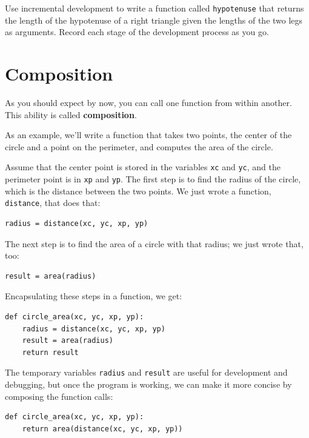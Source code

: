 \documentclass[10pt]{book}
\begin{document}
\begin{ex}


Use incremental development to write a function
called {\tt hypotenuse} that returns the length of the hypotenuse of a
right triangle given the lengths of the two legs as arguments.
Record each stage of the development process as you go.
\end{ex}


\section{Composition}


As you should expect by now, you can call one function from
within another.  This ability is called {\bf composition}.

As an example, we'll write a function that takes two points,
the center of the circle and a point on the perimeter, and computes
the area of the circle.

Assume that the center point is stored in the variables {\tt xc} and
{\tt yc}, and the perimeter point is in {\tt xp} and {\tt yp}. The
first step is to find the radius of the circle, which is the distance
between the two points.  We just wrote a function, {\tt
distance}, that does that:

\beforeverb
\begin{verbatim}
radius = distance(xc, yc, xp, yp)
\end{verbatim}
\afterverb
%
The next step is to find the area of a circle with that radius;
we just wrote that, too:

\beforeverb
\begin{verbatim}
result = area(radius)
\end{verbatim}
\afterverb
%
Encapsulating these steps in a function, we get:


\beforeverb
\begin{verbatim}
def circle_area(xc, yc, xp, yp):
    radius = distance(xc, yc, xp, yp)
    result = area(radius)
    return result
\end{verbatim}
\afterverb
%
The temporary variables {\tt radius} and {\tt result} are useful for
development and debugging, but once the program is working, we can
make it more concise by composing the function calls:

\beforeverb
\begin{verbatim}
def circle_area(xc, yc, xp, yp):
    return area(distance(xc, yc, xp, yp))
\end{verbatim}
\afterverb
%
\end{document}
